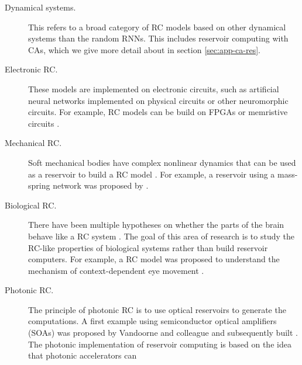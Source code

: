 \begin{description}
  \item[Dynamical systems.] This refers to a broad category of \ac{RC} models
        based on other dynamical systems than the random \acp{RNN}. This
        includes reservoir computing with \aclp{CA}, which we give more detail
        about in section \ref{sec:app-ca-res}.
  \item[Electronic \ac{RC}.] These models are implemented on electronic circuits,
        such as artificial neural networks implemented on physical circuits or
        other neuromorphic circuits. For example, \ac{RC} models can be build on
        FPGAs \parencite{antonikApplicationFPGAReal2018,
        verstraetenReservoirComputingStochastic2005,
        alomarLowcostHardwareImplementation2014,
        antonikFPGAImplementationReservoir2015} or memristive circuits
        \parencite{yangInvestigationsStaircaseMemristor2016,
        merkelMemristiveReservoirComputing2014,
        donahueDesignAnalysisNeuromemristive2015}.
  \item[Mechanical \ac{RC}.] Soft mechanical bodies have complex nonlinear
        dynamics that can be used as a reservoir to build a \ac{RC} model
        \parencite{pfeiferHowBodyShapes2007}. For example, a reservoir using a
        mass-spring network was proposed by
        \textcite{hauserTheoreticalFoundationMorphological2011}.
  \item[Biological \ac{RC}.] There have been multiple hypotheses on whether the
        parts of the brain behave like a \ac{RC} system
        \parencite{yamazakiCerebellumLiquidState2007}. The goal of this area of
        research is to study the \ac{RC}-like properties of
        biological systems rather than build reservoir computers. For example, a
        \ac{RC} model was proposed to understand the mechanism of
        context-dependent eye movement
        \parencite{domineyComplexSensorymotorSequence1995,
        domineyModelCorticostriatalPlasticity1995}.
  \item[Photonic \ac{RC}.] The principle of photonic \ac{RC} is to use optical
        reservoirs to generate the computations. A first example using
        semiconductor optical amplifiers (SOAs) was proposed by
        Vandoorne and colleague \parencite{vandoorneOpticalSignalProcessing2008,
        vandoorneParallelReservoirComputing2011} and subsequently built \parencite{vandoorneExperimentalDemonstrationReservoir2014}.
        The photonic implementation of reservoir computing is based on the idea that
        photonic accelerators \parencite{kitayamaNovelFrontierPhotonics2019} can

\end{description}
